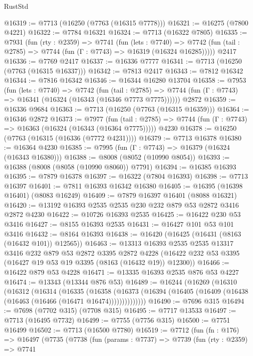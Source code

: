 \begin{lexlean}{RustStd}
\begin{coremodule}
@16319 := @7713 (@16250 (@7763 (@16315 @7778)))
@16321 := @16275 (@7800 @4221)
@16322 := @7784 @16321
@16324 := @7713 (@16322 @7805)
@16335 := @7931
    (fun (rty : @2359) =>
    @7741
      (fun (lets : @7740) =>
      @7742 (fun (tail : @2785) => @7744 (fun (Γ : @7743) => @16319 (@16324 @16285)))))
    @2417
@16336 := @7769 @2417
@16337 := @16336 @7777
@16341 := @7713 (@16250 (@7763 (@16315 @16337)))
@16342 := @7813 @2417
@16343 := @7812 @16342
@16344 := @7816 @16342
@16346 := @16344 @16280 @13704
@16358 := @7953
    (fun (lets : @7740) =>
    @7742
      (fun (tail : @2785) =>
      @7744 (fun (Γ : @7743) => @16341 (@16324 (@16343 (@16346 @7773 @7775))))))
    @2872
@16359 := @16336 @9684
@16363 := @7713 (@16250 (@7763 (@16315 @16359)))
@16364 := @16346 @2872
@16373 := @7977
    (fun (tail : @2785) => @7744 (fun (Γ : @7743) => @16363 (@16324 (@16343 (@16364 @7775)))))
    @4230
@16378 := @16250 (@7763 (@16315 (@16336 (@7772 @4231))))
@16379 := @7713 @16378
@16380 := @16364 @4230
@16385 := @7995 (fun (Γ : @7743) => @16379 (@16324 (@16343 @16380)))
@16388 := @8008 (@8052 (@10990 @8054))
@16393 := @16388 (@8008 (@8058 (@10990 @8060)) @7791)
@16394 := @16385 @16393
@16395 := @7879 @16378
@16397 := @16322 (@7804 @16393)
@16398 := @7713 @16397
@16401 := @7811 @16393 @16342 @16380
@16405 := @16395 (@16398 @16401) (@8083 @16249)
@16409 := @7879 @16397 @16401 (@8088 @16321)
@16420 := @13192 @16393 @2535 @2535 @230 @232 @879 @53 @2872 @3416 @2872 @4230
@16422 := @10726 @16393 @2535
@16425 := @16422 @230 @53 @3416
@16427 := @8155 @16393 @2535
@16431 := @16427 @101 @53 @101 @3416
@16432 := @8164 @16393
@16438 := @16420 (@16425 (@16431 (@8163 (@16432 @101)) @12565))
@16463 := @13313
    @16393
    @2535
    @2535
    @13317
    @3416
    @232
    @879
    @53
    @2872
    @3395
    @2872
    @4228
    (@16422 @232 @53 @3395 (@16427 @19 @53 @19 @3395 (@8163 (@16432 @19)) @12300))
@16466 := @16422 @879 @53 @4228
@16471 := @13335 @16393 @2535 @876 @53 @4227
@16474 := @13343 (@13344 @876 @53)
@16489 := @16244
    (@16269
      (@16310
        (@16312
          (@16314
            (@16335
              (@16358
                (@16373 (@16394 (@16405 (@16409 (@16438 (@16463 (@16466 (@16471 @16474))))))))))))))
@16490 := @7696 @315
@16494 := @7698 (@7702 @315) (@7708 @315)
@16495 := @7717 @13533
@16497 := @7713 (@16495 @7732)
@16499 := @7755 (@7756 @315)
@16500 := @7751 @16499
@16502 := @7713 (@16500 @7780)
@16519 := @7712
    (fun (fn : @176) =>
    @16497
      (@7735
        (@7738
          (fun (params : @7737) =>
          @7739
            (fun (rty : @2359) =>
            @7741

\end{coremodule}
\end{lexlean}
